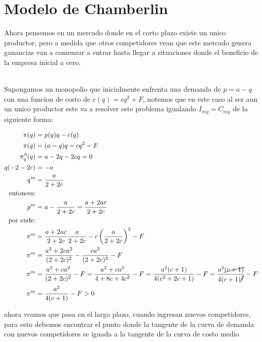 \documentclass[11pt]{article}
\begin{document}
\section{Modelo de Chamberlin}

\begin{flushleft}
    Ahora pensemos en un mercado donde en el corto plazo existe un unico productor, pero a medida que otros competidores vean que este mercado genera ganancias van a comenzar a entrar hasta llegar a situaciones donde el beneficio de la empresa inicial a cero.\\~\\

    \begin{example}
        Supongamos un monopolio que inicialmente enfrenta una demanda de $p=a-q$ con una funcion de costo de $c(q)=cq^2+F$, notemos que en este caso al ser aun un unico productor este va a resolver este problema igualando $I_{mg}=C_{mg}$ de la siguiente forma:

        \begin{align*}
            \pi(q)&=p(q)q-c(q)\\
            \pi(q)&=(a-q)q-cq^2-F\\
            \pi^\partial_q(q)&=a-2q-2cq=0\\
            q(-2-2c)&=-a\\
            q^m&=\frac{a}{2+2c}\\
            \text{entonces:}\\
            p^m&=a-\frac{a}{2+2c}=\frac{a+2ac}{2+2c}\\
            \text{por ende:}\\
            \pi^m&=\frac{a+2ac}{2+2c}\frac{a}{2+2c}-c\left(\frac{a}{2+2c}\right)^2-F\\
            \pi^m&=\frac{a^2+2ca^2}{(2+2c)^{2}}-\frac{ca^{2}}{(2+2c)^{2}}-F\\
            \pi^m&=\frac{a^2+ca^2}{(2+2c)^{2}}-F=\frac{a^2+ca^2}{4+8c+4c^2}-F=\frac{a^2(c+1)}{4(c^2+2c+1)}-F=\frac{a^2\cancel{(c+1)}}{4(c+1)\cancel{^2}}-F\\
            \pi^m&=\frac{a^2}{4(c+1)}-F>0
        \end{align*}

        ahora veamos que pasa en el largo plazo, cuando ingresan nuevos competidores, para esto debemos encontrar el punto donde la tangente de la curva de demanda con nuevos competidores se iguada a la tangente de la curva de costo medio\\
        

\end{example}
\end{flushleft}
\end{document}

